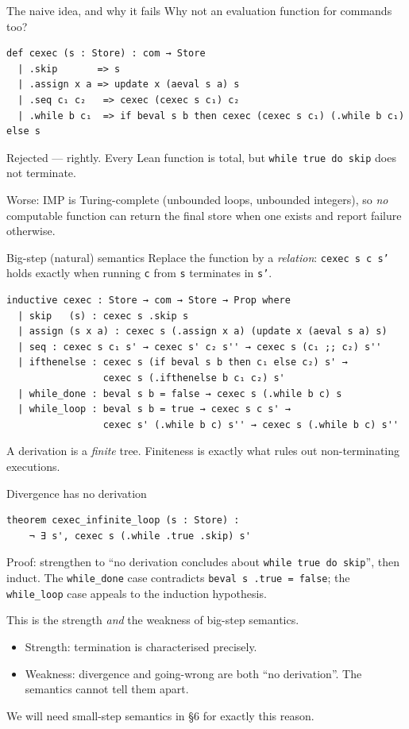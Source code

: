 \documentclass[aspectratio=169,10pt]{beamer}
\newcommand{\code}[1]{\texttt{\small #1}}
\begin{document}
\begin{frame}[fragile]{The naive idea, and why it fails}
Why not an evaluation function for commands too?
\begin{lstlisting}
def cexec (s : Store) : com → Store
  | .skip       => s
  | .assign x a => update x (aeval s a) s
  | .seq c₁ c₂   => cexec (cexec s c₁) c₂
  | .while b c₁  => if beval s b then cexec (cexec s c₁) (.while b c₁) else s
\end{lstlisting}
\pause
Rejected --- rightly.  Every Lean function is total, but
\code{while true do skip} does not terminate.
\medskip

Worse: IMP is Turing-complete (unbounded loops, unbounded integers), so
\emph{no} computable function can return the final store when one exists and
report failure otherwise.
\end{frame}

\begin{frame}[fragile]{Big-step (natural) semantics}
Replace the function by a \emph{relation}: \code{cexec s c s'} holds exactly
when running \code{c} from \code{s} terminates in \code{s'}.
\begin{lstlisting}
inductive cexec : Store → com → Store → Prop where
  | skip   (s) : cexec s .skip s
  | assign (s x a) : cexec s (.assign x a) (update x (aeval s a) s)
  | seq : cexec s c₁ s' → cexec s' c₂ s'' → cexec s (c₁ ;; c₂) s''
  | ifthenelse : cexec s (if beval s b then c₁ else c₂) s' →
                 cexec s (.ifthenelse b c₁ c₂) s'
  | while_done : beval s b = false → cexec s (.while b c) s
  | while_loop : beval s b = true → cexec s c s' →
                 cexec s' (.while b c) s'' → cexec s (.while b c) s''
\end{lstlisting}
A derivation is a \emph{finite} tree.  Finiteness is exactly what rules out
non-terminating executions.
\end{frame}

\begin{frame}[fragile]{Divergence has no derivation}
\begin{lstlisting}
theorem cexec_infinite_loop (s : Store) :
    ¬ ∃ s', cexec s (.while .true .skip) s'
\end{lstlisting}
Proof: strengthen to ``no derivation concludes about
\code{while true do skip}'', then induct.  The \code{while\_done} case
contradicts \code{beval s .true = false}; the \code{while\_loop} case appeals
to the induction hypothesis.
\medskip
\pause

This is the strength \emph{and} the weakness of big-step semantics.

\begin{itemize}
\item Strength: termination is characterised precisely.
\item Weakness: divergence and going-wrong are both ``no derivation''.
      The semantics cannot tell them apart.
\end{itemize}
\medskip
We will need small-step semantics in \S6 for exactly this reason.
\end{frame}
\end{document}
